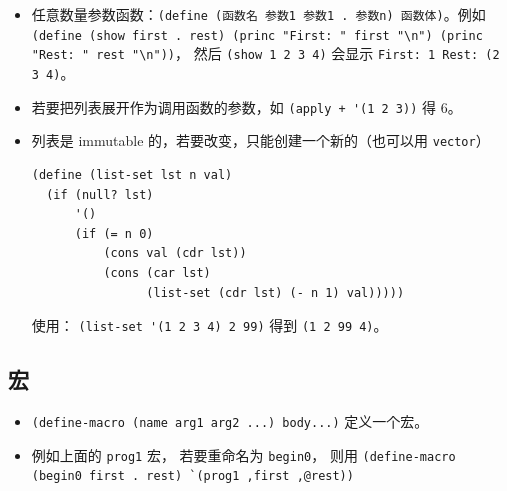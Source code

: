 \begin{itemize}
\item 任意数量参数函数：\verb`(define (函数名 参数1 参数1 . 参数n) 函数体)`。例如 \verb`(define (show first . rest) (princ "First: " first "\n") (princ "Rest: " rest "\n"))`， 然后 \verb`(show 1 2 3 4)` 会显示 \verb`First: 1 Rest: (2 3 4)`。
\item 若要把列表展开作为调用函数的参数，如 \verb`(apply + '(1 2 3))` 得 6。
\item 列表是 immutable 的，若要改变，只能创建一个新的（也可以用 \verb`vector`）
\begin{lstlisting}[language=none]
(define (list-set lst n val)
  (if (null? lst)
      '()
      (if (= n 0)
          (cons val (cdr lst))
          (cons (car lst)
                (list-set (cdr lst) (- n 1) val)))))
\end{lstlisting}
使用： \verb`(list-set '(1 2 3 4) 2 99)` 得到 \verb`(1 2 99 4)`。
\end{itemize}


\subsection{宏}
\begin{itemize}
\item \verb`(define-macro (name arg1 arg2 ...) body...)` 定义一个宏。
\item 例如上面的 \verb`prog1` 宏， 若要重命名为 \verb`begin0`， 则用 \verb|(define-macro (begin0 first . rest) `(prog1 ,first ,@rest))|
\end{itemize}

